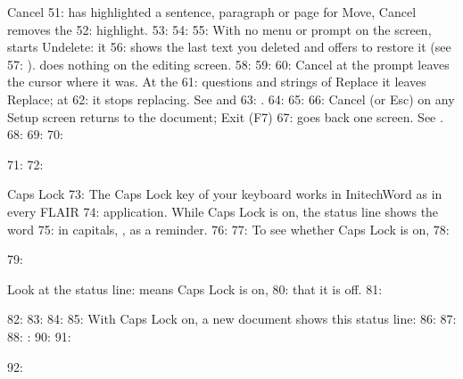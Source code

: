 \begin{Feature}{Cancel}
51: has highlighted a sentence, paragraph or page for Move, Cancel removes the
52: highlight.
53: 
54: 
55: With no menu or prompt on the screen,  starts Undelete: it
56: shows the last text you deleted and offers to restore it (see
57: ).   does nothing on the editing screen.
58: 
59: 
60: Cancel at the  prompt leaves the cursor where it was.  At the
61: questions and strings of Replace it leaves Replace; at
62:  it stops replacing.  See  and
63: .
64: 
65: 
66: Cancel (or Esc) on any Setup screen returns to the document; Exit (F7)
67: goes back one screen.  See .
68: 
69: 
70: \end{Feature}
71: 
72: \begin{Feature}{Caps Lock}
73: The Caps Lock key of your keyboard works in InitechWord as in every FLAIR
74: application.  While Caps Lock is on, the status line shows the word
75:  in capitals, , as a reminder.
76: 
77: To see whether Caps Lock is on,
78: \begin{WPSteps}
79: \item Look at the status line:  means Caps Lock is on, 
80: that it is off.
81: \end{WPSteps}
82: 
83: 
84: %
85: With Caps Lock on, a new document shows this status line:
86: 
87: %
88: : 
90: 
91: \end{Feature}
92: 
